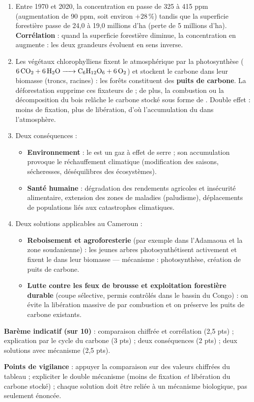 \documentclass[11pt]{article}
\begin{document}
\begin{corrige}
\begin{enumerate}
\item Entre 1970 et 2020, la concentration en  passe de 325 à 415 ppm (augmentation de 90 ppm, soit environ $+28\,\%$) tandis que la superficie forestière passe de 24,0 à 19,0 millions d'ha (perte de 5 millions d'ha). \textbf{Corrélation} : quand la superficie forestière diminue, la concentration en  augmente : les deux grandeurs évoluent en sens inverse.
\item Les végétaux chlorophylliens fixent le  atmosphérique par la photosynthèse ($\ce{6CO2 + 6H2O -> C6H12O6 + 6O2}$) et stockent le carbone dans leur biomasse (troncs, racines) : les forêts constituent des \textbf{puits de carbone}. La déforestation supprime ces fixateurs de  ; de plus, la combustion ou la décomposition du bois relâche le carbone stocké sous forme de . Double effet : moins de fixation, plus de libération, d'où l'accumulation du  dans l'atmosphère.
\item Deux conséquences :
\begin{itemize}
\item \textbf{Environnement} : le  est un gaz à effet de serre ; son accumulation provoque le réchauffement climatique (modification des saisons, sécheresses, déséquilibres des écosystèmes).
\item \textbf{Santé humaine} : dégradation des rendements agricoles et insécurité alimentaire, extension des zones de maladies (paludisme), déplacements de populations liés aux catastrophes climatiques.
\end{itemize}
\item Deux solutions applicables au Cameroun :
\begin{itemize}
\item \textbf{Reboisement et agroforesterie} (par exemple dans l'Adamaoua et la zone soudanienne) : les jeunes arbres photosynthétisent activement et fixent le  dans leur biomasse — mécanisme : photosynthèse, création de puits de carbone.
\item \textbf{Lutte contre les feux de brousse et exploitation forestière durable} (coupe sélective, permis contrôlés dans le bassin du Congo) : on évite la libération massive de  par combustion et on préserve les puits de carbone existants.
\end{itemize}
\end{enumerate}
\textbf{Barème indicatif (sur 10)} : comparaison chiffrée et corrélation (2,5 pts) ; explication par le cycle du carbone (3 pts) ; deux conséquences (2 pts) ; deux solutions avec mécanisme (2,5 pts).

\textbf{Points de vigilance} : appuyer la comparaison sur des valeurs chiffrées du tableau ; expliciter le double mécanisme (moins de fixation \emph{et} libération du carbone stocké) ; chaque solution doit être reliée à un mécanisme biologique, pas seulement énoncée.
\end{corrige}
\end{document}
